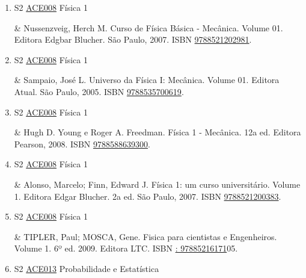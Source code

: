\documentclass[12pt,a4paper]{book}
\begin{document}
\begin{enumerate}
& Resnick, Robert.  Halliday, David, krane, Kenneth S.  Física 1.  Volume 1.  5a edição.  Editora Livros Técnicos e Científicos.  Rio de Janeiro, 2003.  ISBN \href{http://www.bn.br/site/pages/servicosProfissionais/agenciaISBN/isbnBusca/FbnBuscaISBNCatalogo.asp?pField=ISBN&pIntPagina=1&pISBN=21613527&nidbISBN=true&hidbISBN=true}{9788521613527}. 

 

 \item S2 \hyperref[PUD:ACE008]{ACE008} Física 1

& Nussenzveig, Herch M.  Curso de Física Básica -  Mecânica.  Volume 01.  Editora Edgbar Blucher.  São Paulo, 2007.  ISBN \href{http://www.bn.br/site/pages/servicosProfissionais/agenciaISBN/isbnBusca/FbnBuscaISBNCatalogo.asp?pField=ISBN&pIntPagina=1&pISBN=21202981&nidbISBN=true&hidbISBN=true}{9788521202981}. 

 

 \item S2 \hyperref[PUD:ACE008]{ACE008} Física 1

& Sampaio, José L.  Universo da Física I: Mecânica.  Volume 01.  Editora Atual.  São Paulo, 2005.  ISBN \href{http://www.bn.br/site/pages/servicosProfissionais/agenciaISBN/isbnBusca/FbnBuscaISBNCatalogo.asp?pField=ISBN&pIntPagina=1&pISBN=35700619&nidbISBN=true&hidbISBN=true}{9788535700619}.
 \item S2 \hyperref[PUD:ACE008]{ACE008} Física 1

& Hugh D.  Young e Roger A.  Freedman.  Física 1 - Mecânica.  12a ed.  Editora Pearson, 2008. 
ISBN \href{http://www.bn.br/site/pages/servicosProfissionais/agenciaISBN/isbnBusca/FbnBuscaISBNCatalogo.asp?pField=ISBN&pIntPagina=1&pISBN=88639300&nidbISBN=true&hidbISBN=true}{9788588639300}. 

 

 \item S2 \hyperref[PUD:ACE008]{ACE008} Física 1

& Alonso, Marcelo;  Finn, Edward J.  Física 1: um curso universitário.  Volume 1.  Editora Edgar Blucher.  2a ed.  São Paulo, 2007.  ISBN \href{http://www.bn.br/site/pages/servicosProfissionais/agenciaISBN/isbnBusca/FbnBuscaISBNCatalogo.asp?pField=ISBN&pIntPagina=1&pISBN=21200383&nidbISBN=true&hidbISBN=true}{9788521200383}. 

 

 \item S2 \hyperref[PUD:ACE008]{ACE008} Física 1

&   TIPLER, Paul;  MOSCA, Gene.  Fisica para cientistas e Engenheiros.  Volume 1.  6º ed.  2009.  Editora LTC.  ISBN \href{http://www.google.com/search?hl=pt-BR&tbo=p&tbm=bks&q=isbn:: 97885216171&num=10}{: 97885216171}05.
 \item S2 \hyperref[PUD:ACE013]{ACE013} Probabilidade e Estatística


\end{enumerate}
\end{document}
